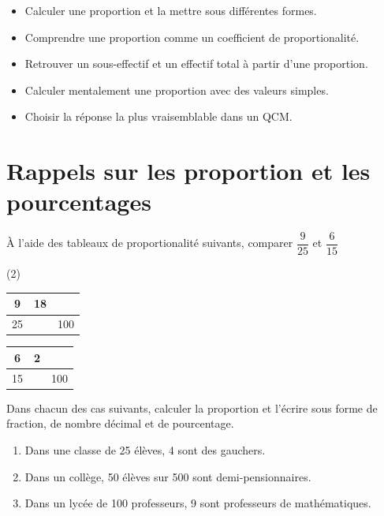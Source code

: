 \documentclass[10pt,a4paper]{article}
\begin{document}

\vspace{-0.3cm}

\begin{objectifs}
\begin{itemize}
    \item Calculer une proportion et la mettre sous différentes formes. 
    \item Comprendre une proportion comme un coefficient de proportionalité.
    \item Retrouver un sous-effectif et un effectif total à partir d'une proportion.
    \item Calculer mentalement une proportion avec des valeurs simples.
    \item Choisir la réponse la plus vraisemblable dans un QCM.
\end{itemize}
\end{objectifs}


\section{Rappels sur les proportion et les pourcentages}

\begin{exo}[][]
À l'aide des tableaux de proportionalité suivants, comparer \(\dfrac{9}{25}\) et \(\dfrac{6}{15}\)
   
    \begin{tasks}(2)
        \task   \renewcommand{\arraystretch}{1.5}  \begin{tabular}{|*{3}{c|}}
        \hline
          9 & 18 & \\ \hline
         25 &  & 100 \\ \hline
    \end{tabular} 

    \task \renewcommand{\arraystretch}{1.5} \begin{tabular}{|*{3}{c|}}
        \hline
          6 & 2 &  \\ \hline
          15 &  & 100\\ \hline
    \end{tabular} 
    \end{tasks} 
   
\end{exo}

\begin{exo}[][]
Dans chacun des cas suivants, calculer la proportion et l'écrire sous forme de fraction, de nombre décimal et de pourcentage.
\begin{enumerate}
    \item Dans une classe de 25 élèves, 4 sont des gauchers.
    \item Dans un collège, 50 élèves sur 500 sont demi-pensionnaires.
    \item Dans un lycée de 100 professeurs, 9 sont professeurs de mathématiques.
\end{enumerate}
\end{exo}
\end{document}
